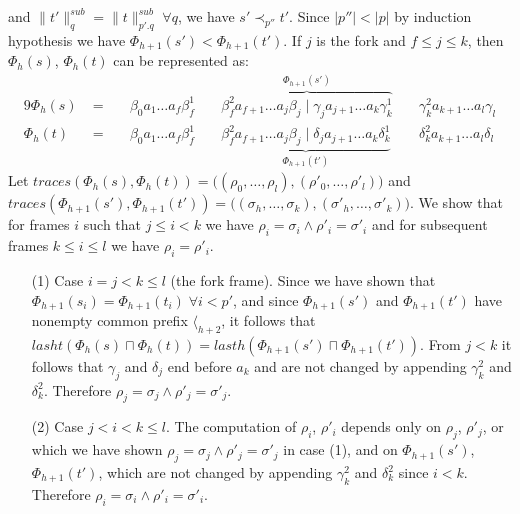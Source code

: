 \documentclass[AMA,STIX1COL]{WileyNJD-v2}
\newcommand{\Xl}{\langle}
\newcommand{\snorm}[2]{\|{#1}\|^{sub}_{#2}}
\begin{document}
\begin{proofEnd}
    and $\snorm{t'}{q} = \snorm{t}{p'.q} \;\forall q$,
    we have $s' \prec_{p''} t'$.
    Since $|p''| < |p|$ by induction hypothesis we have $\Phi_{h+1}(s') < \Phi_{h+1}(t')$.
    If $j$ is the fork and $f \leq j \leq k$, then
    $\Phi_{h}(s)$, $\Phi_{h}(t)$ can be represented as:
    \begin{alignat*}{9}
        \Phi_{h}(s)
            \;&=
                \;&& \beta_0 a_1 \dots a_f \beta_f^1
                \;&& \overbrace {\beta_f^2  a_{f+1} \dots a_j \beta_j \;\big|\; \gamma_j a_{j+1} \dots a_k \gamma_k^1}^{\Phi_{h+1}(s')}
                \;&& \gamma_k^2 a_{k+1} \dots a_l \gamma_l
                \\[-0.5em]
        \Phi_{h}(t)
            \;&=
                \;&& \beta_0 a_1 \dots a_f \beta_f^1
                \;&& \underbrace {\beta_f^2  a_{f+1} \dots a_j \beta_j \;\big|\; \delta_j a_{j+1} \dots a_k \delta_k^1}_{\Phi_{h+1}(t')}
                \;&& \delta_k^2 a_{k+1} \dots a_l \delta_l
    \end{alignat*}
    Let $traces (\Phi_{h}(s), \Phi_{h}(t)) = \big( (\rho_0, \dots, \rho_l), (\rho'_0, \dots, \rho'_l) \big)$
    and $traces (\Phi_{h+1}(s'), \Phi_{h+1}(t')) = \big( (\sigma_h, \dots, \sigma_k), (\sigma'_h, \dots, \sigma'_k) \big)$.
    We show that for frames $i$ such that $j \leq i < k$ we have
    $\rho_i = \sigma_i \wedge \rho'_i = \sigma'_i$
    and for subsequent frames $k \leq i \leq l$ we have $\rho_i = \rho'_i$.
    \begin{itemize}[itemsep=0.5em, topsep=0.5em]
    \item[(1)]
        Case $i = j < k \leq l$ (the fork frame).
        Since we have shown that $\Phi_{h+1}(s_i) = \Phi_{h+1}(t_i) \;\forall i < p'$,
        and since $\Phi_{h+1}(s')$ and $\Phi_{h+1}(t')$ have nonempty common prefix $\Xl_{h+2}$,
        it follows that $lasht (\Phi_{h}(s) \sqcap \Phi_{h}(t)) = lasth (\Phi_{h+1}(s') \sqcap \Phi_{h+1}(t'))$.
        From $j < k$ it follows that $\gamma_j$ and $\delta_j$ end before $a_k$
        and are not changed by appending $\gamma^2_k$ and $\delta^2_k$.
        Therefore $\rho_j = \sigma_j \wedge \rho'_j = \sigma'_j$.

    \item[(2)]
        Case $j < i < k \leq l$.
        The computation of $\rho_i$, $\rho'_i$ depends only on
        $\rho_j$, $\rho'_j$,
        or which we have shown $\rho_j = \sigma_j \wedge \rho'_j = \sigma'_j$ in case (1),
        and on $\Phi_{h+1}(s')$, $\Phi_{h+1}(t')$,
        which are not changed by appending $\gamma^2_k$ and $\delta^2_k$ since $i < k$.
        Therefore $\rho_i = \sigma_i \wedge \rho'_i = \sigma'_i$.


\end{itemize}
\end{proofEnd}
\end{document}
